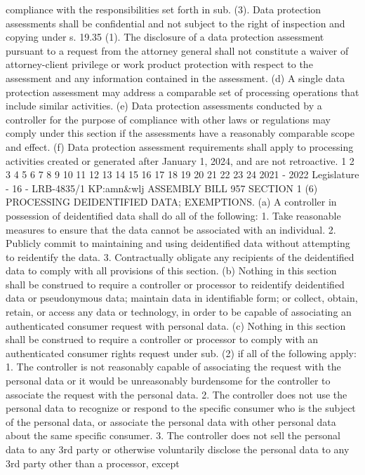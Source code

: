 compliance with the responsibilities set forth in sub. (3). Data protection
assessments shall be confidential and not subject to the right of inspection and
copying under s. 19.35 (1). The disclosure of a data protection assessment pursuant
to a request from the attorney general shall not constitute a waiver of attorney-client
privilege or work product protection with respect to the assessment and any
information contained in the assessment.
(d) A single data protection assessment may address a comparable set of
processing operations that include similar activities.
(e) Data protection assessments conducted by a controller for the purpose of
compliance with other laws or regulations may comply under this section if the
assessments have a reasonably comparable scope and effect.
(f) Data protection assessment requirements shall apply to processing
activities created or generated after January 1, 2024, and are not retroactive.
1
2
3
4
5
6
7
8
9
10
11
12
13
14
15
16
17
18
19
20
21
22
23
24
2021 - 2022 Legislature - 16 - LRB-4835/1
KP:amn&wlj
 ASSEMBLY BILL 957 SECTION 1
(6) PROCESSING DEIDENTIFIED DATA; EXEMPTIONS. (a) A controller in possession
of deidentified data shall do all of the following:
1. Take reasonable measures to ensure that the data cannot be associated with
an individual.
2. Publicly commit to maintaining and using deidentified data without
attempting to reidentify the data.
3. Contractually obligate any recipients of the deidentified data to comply with
all provisions of this section.
(b) Nothing in this section shall be construed to require a controller or processor
to reidentify deidentified data or pseudonymous data; maintain data in identifiable
form; or collect, obtain, retain, or access any data or technology, in order to be capable
of associating an authenticated consumer request with personal data.
(c) Nothing in this section shall be construed to require a controller or processor
to comply with an authenticated consumer rights request under sub. (2) if all of the
following apply:
1. The controller is not reasonably capable of associating the request with the
personal data or it would be unreasonably burdensome for the controller to associate
the request with the personal data.
2. The controller does not use the personal data to recognize or respond to the
specific consumer who is the subject of the personal data, or associate the personal
data with other personal data about the same specific consumer.
3. The controller does not sell the personal data to any 3rd party or otherwise
voluntarily disclose the personal data to any 3rd party other than a processor, except
